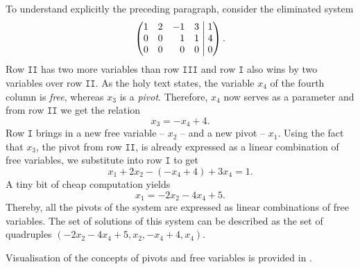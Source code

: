 To understand explicitly the preceding paragraph, consider the eliminated system
\[
 \left(
  \begin{matrix*}[r]
   1 & 2 & -1 & 3\\
   0 & 0 & 1 & 1\\
   0 & 0 & 0 & 0
  \end{matrix*}
  \hspace{1mm}
 \right|
 \left.
  \begin{matrix*}[r]
   1\\
   4\\
   0
  \end{matrix*}
 \right).
\]
Row $\mathtt{II}$ has two more variables than row $\mathtt{III}$ and row
$\mathtt{I}$ also wins by two variables over row $\mathtt{II}$. As the holy text
states, the variable $x_4$ of the fourth column is \emph{free}, whereas $x_3$ is
a \emph{pivot}. Therefore, $x_4$ now serves as a parameter and from row
$\mathtt{II}$ we get the relation
\[
 x_3 = -x_4 + 4.
\]
Row $\mathtt{I}$ brings in a new free variable -- $x_2$ -- and a new pivot --
$x_1$. Using the fact that $x_3$, the pivot from row $\mathtt{II}$, is already
expressed as a linear combination of free variables, we substitute into row
$\mathtt{I}$ to get
\[
 x_1 + 2x_2 - (-x_4 + 4) + 3x_4 = 1.
\]
A tiny bit of cheap computation yields
\[
 x_1 = -2x_2 -4x_4 + 5.
\]
Thereby, all the pivots of the system are expressed as linear combinations of
free variables. The set of solutions of this system can be described as the set
of quadruples $(-2x_2 - 4x_4 + 5, x_2, -x_4 + 4, x_4)$.

Visualisation of the concepts of pivots and free variables is provided in
.

